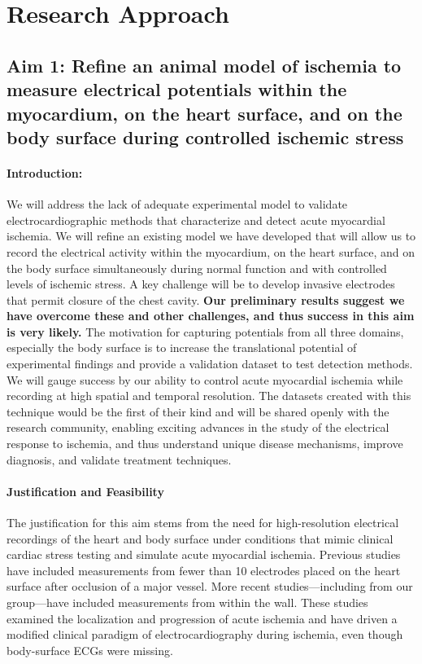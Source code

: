 %
\section{Research Approach}
\label{sec:appr}

\subsection{Aim 1: Refine an animal model of ischemia to measure electrical potentials within the myocardium, on the heart surface, and on the body surface during controlled ischemic stress }
\paragraph{Introduction:}
 We will address the lack of adequate experimental model to validate electrocardiographic methods that characterize and detect acute myocardial ischemia.
We will refine an existing model we have developed
\cite{RSM:Ara2016,BLZ:Zen2018a} that will allow us to record
the electrical activity within the myocardium, on the heart surface, and on
the body surface simultaneously during normal function and with controlled
levels of ischemic stress. A key challenge will be to develop invasive
electrodes that permit closure of the chest cavity. \textbf{Our
  preliminary results suggest we have overcome these and other challenges, and
  thus success in this aim is very likely.} The motivation for
 capturing potentials from all three domains, especially the body surface is
 to increase the translational potential of experimental findings and
 provide a validation dataset to test detection methods.
We will gauge success by our ability to control acute
myocardial ischemia while recording at high spatial and temporal
resolution. The datasets created with this technique would be the first of
their kind and will be shared openly with the research community, enabling
 exciting advances in the study of the electrical response to ischemia, and
 thus understand unique disease mechanisms, improve diagnosis, and validate
 treatment techniques.



\paragraph{Justification and Feasibility} The justification for this aim
stems from the need for high-resolution electrical recordings of the heart
and body surface under conditions that mimic clinical cardiac stress
testing and simulate acute myocardial ischemia.  Previous studies have
included measurements from fewer than 10 electrodes placed on the heart
surface after occlusion of a major
vessel.\cite{BMB:Hol77a,BMB:Hol77b,BLZ:Kle1978,BLZ:Jan1980} More recent
studies---including from our group---have included measurements from within
the wall.\cite{RSM:Cha89,RSM:Mac95e,RSM:Mac97} These studies
examined the localization and progression of acute ischemia and have
driven a modified clinical paradigm of electrocardiography during ischemia, even
though body-surface ECGs were missing.


